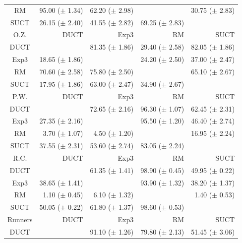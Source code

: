 \documentclass[conference]{IEEEtran}
\begin{document}
\begin{table}
\begin{center}
\begin{tabular}{|c|rrrr|}
             RM    & 95.00 ($\pm$ 1.34)   & 62.20 ($\pm$ 2.98)   &          & 30.75 ($\pm$ 2.83)   \\
           SUCT    & 26.15 ($\pm$ 2.40)   & 41.55 ($\pm$ 2.82)   & 69.25 ($\pm$ 2.83)   &          \\
\hline
\hline
       O.Z.   &       DUCT   &       Exp3   &         RM   &       SUCT   \\
\hline
           DUCT    &          & 81.35 ($\pm$ 1.86)   & 29.40 ($\pm$ 2.58)   & 82.05 ($\pm$ 1.86)   \\
           Exp3    & 18.65 ($\pm$ 1.86)   &          & 24.20 ($\pm$ 2.50)   & 37.00 ($\pm$ 2.47)   \\
             RM    & 70.60 ($\pm$ 2.58)   & 75.80 ($\pm$ 2.50)   &          & 65.10 ($\pm$ 2.67)   \\
           SUCT    & 17.95 ($\pm$ 1.86)   & 63.00 ($\pm$ 2.47)   & 34.90 ($\pm$ 2.67)   &          \\
\hline
\hline
   P.W.   &       DUCT   &       Exp3   &         RM   &       SUCT   \\
\hline
           DUCT    &          & 72.65 ($\pm$ 2.16)   & 96.30 ($\pm$ 1.07)   & 62.45 ($\pm$ 2.31)   \\
           Exp3    & 27.35 ($\pm$ 2.16)   &          & 95.50 ($\pm$ 1.20)   & 46.40 ($\pm$ 2.74)   \\
             RM    & 3.70 ($\pm$ 1.07)   & 4.50 ($\pm$ 1.20)   &          & 16.95 ($\pm$ 2.24)   \\
           SUCT    & 37.55 ($\pm$ 2.31)   & 53.60 ($\pm$ 2.74)   & 83.05 ($\pm$ 2.24)   &          \\
\hline
\hline
R.C.   &       DUCT   &       Exp3   &         RM   &       SUCT   \\
\hline
           DUCT    &          & 61.35 ($\pm$ 1.41)   & 98.90 ($\pm$ 0.45)   & 49.95 ($\pm$ 0.22)   \\
           Exp3    & 38.65 ($\pm$ 1.41)   &          & 93.90 ($\pm$ 1.32)   & 38.20 ($\pm$ 1.37)   \\
             RM    & 1.10 ($\pm$ 0.45)   & 6.10 ($\pm$ 1.32)   &          & 1.40 ($\pm$ 0.53)   \\
           SUCT    & 50.05 ($\pm$ 0.22)   & 61.80 ($\pm$ 1.37)   & 98.60 ($\pm$ 0.53)   &          \\
\hline
\hline
        Runners   &       DUCT   &       Exp3   &         RM   &       SUCT   \\
\hline
           DUCT    &          & 91.10 ($\pm$ 1.26)   & 79.80 ($\pm$ 2.13)   & 51.45 ($\pm$ 3.06)   \\

\end{tabular}
\end{center}
\end{table}
\end{document}

